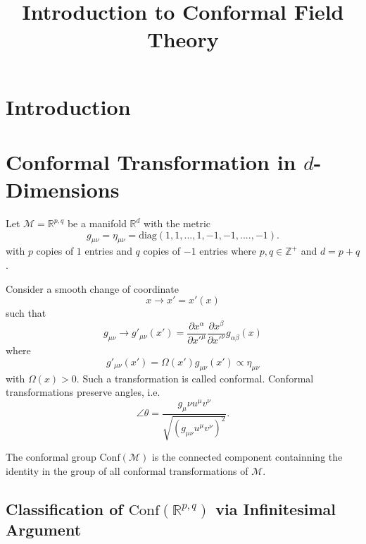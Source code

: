 \documentclass[a4paper,11pt]{article}
\title{\boldmath Introduction to Conformal Field Theory}
\begin{document}
 
\maketitle
\flushbottom
\newpage
\section{Introduction}

\section{Conformal Transformation in $d$-Dimensions}

Let $\mathcal{M}=\mathbb{R}^{p,q}$ be a manifold $\mathbb{R}^d$ with the metric
\begin{equation}
    g_{\mu\nu}=\eta_{\mu\nu}=\mathrm{diag}(1,1,...,1,-1,-1,....,-1).
\end{equation}
with $p$ copies of $1$ entries and $q$ copies of $-1$ entries where $p,q\in\mathbb{Z}^+$ and $d=p+q$.

Consider a smooth change of coordinate
\begin{equation}
    x\rightarrow x'=x'(x)
\end{equation}
such that
\begin{equation}
    g_{\mu\nu}\rightarrow g'_{\mu\nu}(x')=\frac{\partial x^\alpha}{\partial x'^\mu}\frac{\partial x^\beta}{\partial x'^\nu}g_{\alpha\beta}(x)
\end{equation}
where
\begin{equation}
    g'_{\mu\nu}(x')=\Omega(x')g_{\mu\nu}(x')\propto\eta_{\mu\nu}
\end{equation}
with $\Omega(x)>0$. Such a transformation is called conformal. Conformal transformations preserve angles, i.e.
\begin{equation}
    \angle\theta=\frac{g_\mu\nu u^\mu v^\nu}{\sqrt{(g_{\mu\nu} u^\mu v^\nu)^2}}.
\end{equation}
\begin{framed}
    The conformal group $\mathrm{Conf}(\mathcal{M})$ is the connected component containning the identity in the group of all conformal transformations of $\mathcal{M}$.
\end{framed}
\subsection{Classification of $\mathrm{Conf}(\mathbb{R}^{p,q})$ via Infinitesimal Argument}
\end{document}
